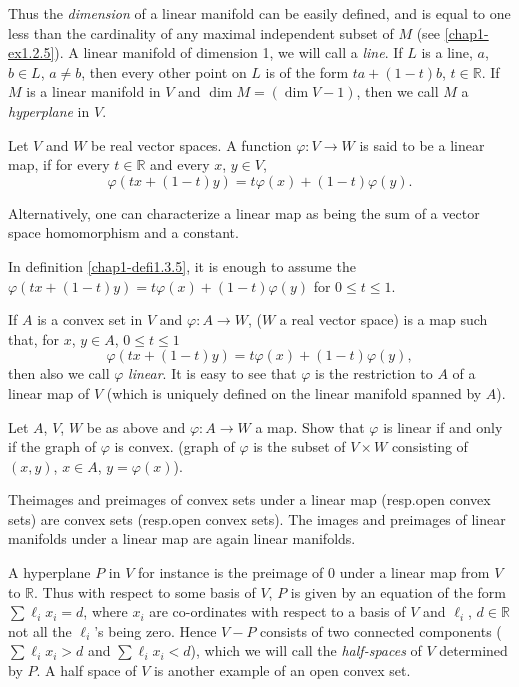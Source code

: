 Thus the {\em dimension} of a linear manifold can be easily defined, and is equal to one less than the cardinality of any maximal independent subset of $M$ (see \ref{chap1-ex1.2.5}). A linear manifold of dimension 1, we will call a {\em line}. If $L$ is a line, $a$, $b\in L$, $a\neq b$, then every other point on $L$ is of the form $ta+(1-t)b$, $t\in \mathbb{R}$. If $M$ is a linear manifold in $V$ and $\dim M=(\dim V-1)$, then we call $M$ a {\em hyperplane} in $V$.

\begin{definition}\label{chap1-defi1.3.5}
Let $V$ and $W$ be real vector spaces. A function $\varphi:V\to W$ is said to be a linear map, if for every $t\in \mathbb{R}$ and every $x$, $y\in V$,
$$
\varphi(tx+(1-t)y)=t\varphi(x)+(1-t)\varphi(y).
$$
\end{definition}

Alternatively, one can characterize a linear map as being the sum of a vector space homomorphism and a constant.

\begin{ex}\label{chap1-ex1.3.6}
In definition \ref{chap1-defi1.3.5}, it is enough to assume the $\varphi(tx+(1-t)y)=t\varphi(x)+(1-t)\varphi(y)$ for $0\leq t\leq 1$.
\end{ex}

If $A$ is a convex set in $V$ and $\varphi:A\to W$, ($W$ a real vector space) is a map such that, for $x$, $y\in A$, $0\leq t\leq 1$
$$
\varphi(tx+(1-t)y)=t\varphi(x)+(1-t)\varphi(y),
$$
then also we call $\varphi$ {\em linear}. It is easy to see that $\varphi$ is the restriction to $A$ of a linear map of $V$ (which is uniquely defined on the linear manifold spanned by $A$). 

\begin{ex}\label{chap1-ex1.3.7}
Let $A$, $V$, $W$ be as above and $\varphi:A\to W$ a map. Show that $\varphi$ is linear if and only if the graph of $\varphi$ is convex. (graph of $\varphi$ is the subset of $V\times W$ consisting of $(x,y)$, $x\in A$, $y=\varphi(x)$). 
\end{ex}

\begin{ex}\label{chap1-ex1.3.8}
The\pageoriginale images and preimages of convex sets under a linear map (resp.\@ open convex sets) are convex sets (resp.\@ open convex sets). The images and preimages of linear manifolds under a linear map are again linear manifolds.
\end{ex}

A hyperplane $P$ in $V$ for instance is the preimage of $0$ under a linear map from $V$ to $\mathbb{R}$. Thus with respect to some basis of $V$, $P$ is given by an equation of the form $\sum \ell_{i}x_{i}=d$, where $x_{i}$ are co-ordinates with respect to a basis of $V$ and $\ell_{i}$, $d\in \mathbb{R}$  not all the $\ell_{i}$'s being zero. Hence $V-P$ consists of two connected components ($\sum \ell_{i}x_{i}>d$ and $\sum \ell_{i}x_{i}<d$), which we will call the {\em half-spaces} of $V$ determined by $P$. A half space of $V$ is another example of an open convex set.

